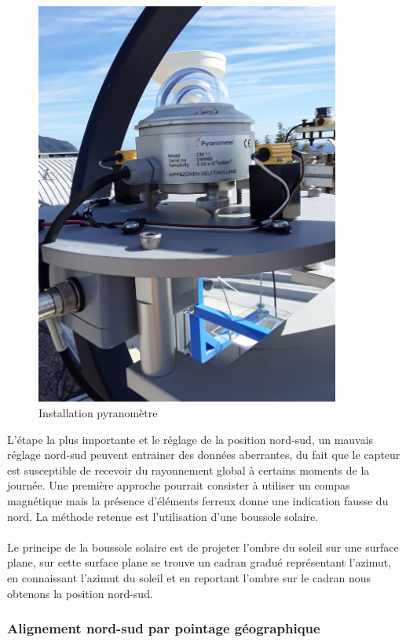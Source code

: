 \documentclass[12pt,a4paper]{article}
\begin{document}
\begin{flushleft}
\begin{figure}[H]
\centering
\includegraphics[width=10cm, angle=-90]{image/montage/4.jpg} 
\caption{Installation pyranomètre}
\end{figure}


L'étape la plus importante et le réglage de la position nord-sud, un mauvais réglage nord-sud peuvent entrainer des données aberrantes, du fait que le capteur est susceptible de recevoir du rayonnement global à certains moments de la journée. Une première approche pourrait consister à utiliser un compas magnétique mais la présence d'éléments ferreux donne une indication fausse du nord. La méthode retenue est l'utilisation d'une boussole solaire.\\
~~\\
Le principe de la boussole solaire est de projeter l'ombre du soleil sur une surface plane, sur cette surface plane se trouve un cadran gradué représentant l'azimut, en connaissant l'azimut du soleil et en reportant l'ombre sur le cadran nous obtenons la position nord-sud.\\

\subsubsection{Alignement nord-sud par pointage géographique}


\end{flushleft}
\end{document}
